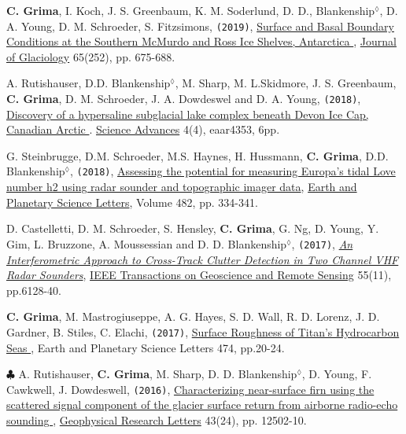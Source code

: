 \begin{etaremune}
\item
  \textbf{C. Grima}, I. Koch, J. S. Greenbaum, K. M. Soderlund, D. D., Blankenship$^\lozenge$, D. A. Young, D. M. Schroeder, S. Fitzsimons, \texttt{(2019)}, \href{https://www.cambridge.org/core/journals/journal-of-glaciology/article/surface-and-basal-boundary-conditions-at-the-southern-mcmurdo-and-ross-ice-shelves-antarctica/3ED3BFD465A3F6A5FC48342694F91EC5}{Surface and Basal Boundary Conditions at the Southern McMurdo and Ross Ice Shelves, Antarctica \aiOpenAccessSquare}, \ul{Journal of Glaciology} 65(252), pp. 675-688.

\item
  A. Rutishauser, D.D. Blankenship$^\lozenge$, M. Sharp, M. L.Skidmore, J. S. Greenbaum, \textbf{C. Grima}, D. M. Schroeder, J. A. Dowdeswel and D. A. Young, \texttt{(2018)}, \href{http://advances.sciencemag.org/content/4/4/eaar4353}{Discovery of a hypersaline subglacial lake complex beneath Devon Ice Cap, Canadian Arctic \aiOpenAccessSquare}. \ul{Science Advances} 4(4), eaar4353, 6pp.
  
\item
  G. Steinbrugge, D.M. Schroeder, M.S. Haynes, H. Hussmann, \textbf{C. Grima}, D.D. Blankenship$^\lozenge$, \texttt{(2018)}, \href{https://www.sciencedirect.com/science/article/pii/S0012821X17306647}{Assessing the potential for measuring Europa's tidal Love number h2 using radar sounder and topographic imager data}, \ul{Earth and Planetary Science Letters}, Volume 482, pp. 334-341.
  
\item
  D. Castelletti, D. M. Schroeder, S. Hensley, \textbf{C. Grima}, G. Ng, D. Young, Y. Gim, L. Bruzzone, A. Moussessian and D. D. Blankenship$^\lozenge$, \texttt{(2017)}, \href{http://ieeexplore.ieee.org/abstract/document/8012547/}{\emph{An Interferometric Approach to Cross-Track Clutter Detection in Two Channel VHF Radar Sounders}}, \ul{IEEE Transactions on Geoscience and Remote Sensing} 55(11), pp.6128-40.

\item
  \textbf{C. Grima}, M. Mastrogiuseppe, A. G. Hayes, S. D. Wall, R. D. Lorenz, J. D. Gardner, B. Stiles, C. Elachi, \texttt{(2017)}, \href{http://www.sciencedirect.com/science/article/pii/S0012821X17303163}{Surface Roughness of Titan's Hydrocarbon Seas \aiOpenAccessSquare}, Earth and Planetary Science Letters 474, pp.20-24.
  
\item
  $\clubsuit$ A. Rutishauser, \textbf{C. Grima}, M. Sharp, D. D. Blankenship$^\lozenge$, D. Young, F. Cawkwell, J. Dowdeswell, \texttt{(2016)}, \href{http://onlinelibrary.wiley.com/doi/10.1002/2016GL071230/full}{Characterizing near-surface firn using the scattered signal component of the glacier surface return from airborne radio-echo sounding \aiOpenAccessSquare}, \ul{Geophysical Research Letters} 43(24), pp. 12502-10.
  

\end{etaremune}
